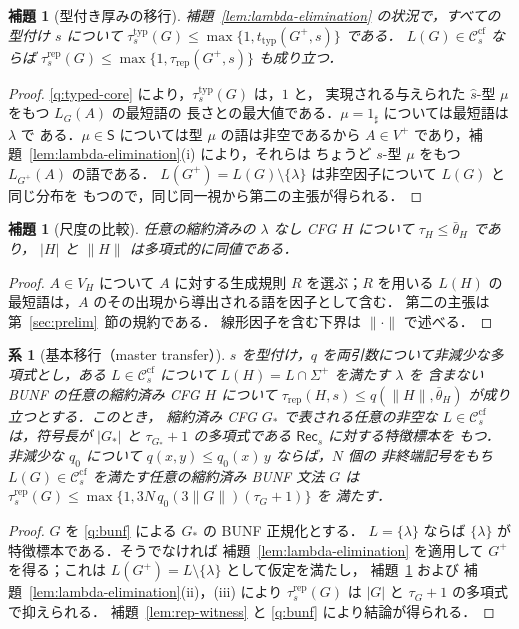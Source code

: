 \documentclass[11pt,a4paper]{ltjsarticle}
\numberwithin{equation}{section}
\theoremstyle{plain}
\newtheorem{lemma}[theorem]{補題}
\newtheorem{corollary}[theorem]{系}
\theoremstyle{definition}
\theoremstyle{remark}
\theoremstyle{plain}
\newcommand{\cf}{\mathrm{cf}}
\newcommand{\Ccf}[1]{\mathcal C_{#1}^{\cf}}
\newcommand{\Rec}{\mathsf{Rec}}
\newcommand{\ttyp}{t_{\mathrm{typ}}}
\newcommand{\trep}{\tau_{\mathrm{rep}}}
\begin{document}
\begin{lemma}[型付き厚みの移行]
\label{lem:typed-transfer}
補題~\ref{lem:lambda-elimination} の状況で，すべての型付け $s$ について
$\tau^{\mathrm{typ}}_s(G)\le\max\{1,\ttyp(G^+,s)\}$ である．
$L(G)\in\Ccf{s}$ ならば
$\tau^{\mathrm{rep}}_s(G)\le\max\{1,\trep(G^+,s)\}$ も成り立つ．
\end{lemma}

\begin{proof}
\ref{q:typed-core} により，$\tau^{\mathrm{typ}}_s(G)$ は，$1$ と，
実現される与えられた $\widehat s$-型 $\mu$ をもつ $L_G(A)$ の最短語の
長さとの最大値である．$\mu=1_\sharp$ については最短語は $\lambda$ で
ある．$\mu\in\mathsf S$ については型 $\mu$ の語は非空であるから
$A\in V^+$ であり，補題~\ref{lem:lambda-elimination}(i) により，それらは
ちょうど $s$-型 $\mu$ をもつ $L_{G^+}(A)$ の語である．
$L(G^+)=L(G)\setminus\{\lambda\}$ は非空因子について $L(G)$ と同じ分布を
もつので，同じ同一視から第二の主張が得られる．
\end{proof}

\begin{lemma}[尺度の比較]
\label{lem:measures}
任意の縮約済みの $\lambda$ なし CFG $H$ について $\tau_H\le\bar\theta_H$ であり，
$|H|$ と $\|H\|$ は多項式的に同値である．
\end{lemma}

\begin{proof}
$A\in V_H$ について $A$ に対する生成規則 $R$ を選ぶ；$R$ を用いる
$L(H)$ の最短語は，$A$ のその出現から導出される語を因子として含む．
第二の主張は第~\ref{sec:prelim}~節の規約である．
線形因子を含む下界は $\|\cdot\|$ で述べる．
\end{proof}

\begin{corollary}[基本移行（master transfer）]
\label{cor:master}
$s$ を型付け，$q$ を両引数について非減少な多項式とし，ある
$L\in\Ccf{s}$ について $L(H)=L\cap\Sigma^+$ を満たす $\lambda$ を
含まない BUNF の任意の縮約済み CFG $H$ について
$\trep(H,s)\le q(\|H\|,\bar\theta_H)$ が成り立つとする．このとき，
縮約済み CFG $G_*$ で表される任意の非空な $L\in\Ccf{s}$ は，符号長が
$|G_*|$ と $\tau_{G_*}+1$ の多項式である $\Rec_s$ に対する特徴標本を
もつ．非減少な $q_0$ について $q(x,y)\le q_0(x)\,y$ ならば，$N$ 個の
非終端記号をもち $L(G)\in\Ccf{s}$ を満たす任意の縮約済み BUNF 文法
$G$ は
$\tau^{\mathrm{rep}}_s(G)\le\max\{1,3N\,q_0(3\|G\|)(\tau_G+1)\}$ を
満たす．
\end{corollary}

\begin{proof}
$G$ を \ref{q:bunf} による $G_*$ の BUNF 正規化とする．
$L=\{\lambda\}$ ならば $\{\lambda\}$ が特徴標本である．そうでなければ
補題~\ref{lem:lambda-elimination} を適用して $G^+$ を得る；これは
$L(G^+)=L\setminus\{\lambda\}$ として仮定を満たし，
補題~\ref{lem:typed-transfer} および
補題~\ref{lem:lambda-elimination}(ii)，(iii) により
$\tau^{\mathrm{rep}}_s(G)$ は $|G|$ と $\tau_G+1$ の多項式で抑えられる．
補題~\ref{lem:rep-witness} と \ref{q:bunf} により結論が得られる．
\end{proof}
\end{document}
